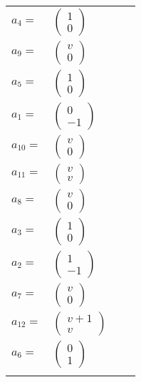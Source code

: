 \documentclass[1p]{elsarticle_modified}
\theoremstyle{definition}
\begin{document}
\begin{tabular}{m{7pt} m{180pt} m{7pt} m{180pt} }
\flushright $a_{4}=$&$\begin{pmatrix}1\\0\end{pmatrix}$ \\
\flushright $a_{9}=$&$\begin{pmatrix}v\\0\end{pmatrix}$ \\
\flushright $a_{5}=$&$\begin{pmatrix}1\\0\end{pmatrix}$ \\
\flushright $a_{1}=$&$\begin{pmatrix}0\\-1\end{pmatrix}$ \\
\flushright $a_{10}=$&$\begin{pmatrix}v\\0\end{pmatrix}$ \\
\flushright $a_{11}=$&$\begin{pmatrix}v\\v\end{pmatrix}$ \\
\flushright $a_{8}=$&$\begin{pmatrix}v\\0\end{pmatrix}$ \\
\flushright $a_{3}=$&$\begin{pmatrix}1\\0\end{pmatrix}$ \\
\flushright $a_{2}=$&$\begin{pmatrix}1\\-1\end{pmatrix}$ \\
\flushright $a_{7}=$&$\begin{pmatrix}v\\0\end{pmatrix}$ \\
\flushright $a_{12}=$&$\begin{pmatrix}v+1\\v\end{pmatrix}$ \\
\flushright $a_{6}=$&$\begin{pmatrix}0\\1\end{pmatrix}$\\&\end{tabular}
\end{document}
